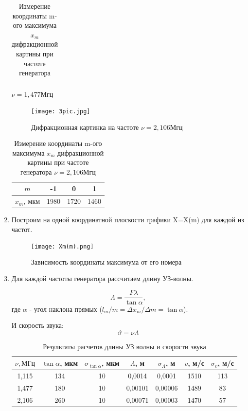 \documentclass[a4paper,12pt]{article} %
\theoremstyle{plain} %
\theoremstyle{definition} %
\theoremstyle{remark} %
\begin{document}
\begin{enumerate}
\begin{table}[!ht]
\begin{tabular}{|c|c|c|c|}
	\end{tabular}
	\caption{Измерение координаты m-ого максимума $x_m$ дифракционной картины при частоте генератора} $\nu=1,477 Мгц$
\end{table}

\newline

\begin{figure}[H]
	\centering
	\texttt{[image: 3pic.jpg]}
	\caption{Дифракционная картинка на частоте $\nu=2,106 Мгц$}
	\label{3diff2}
\end{figure}

\begin{table}[!ht]
	\centering
	\begin{tabular}{|c|c|c|c|}
		\hline
		$m$ &-1&0&1\\
		\hline
		$x_m, \ мкм$ &1980&1720& 1460\\
		\hline
	\end{tabular}
	\caption{Измерение координаты m-ого максимума $x_m$ дифракционной картины при частоте генератора $\nu=2,106 Мгц$}
\end{table}

\item Построим на одной координатной плоскости графики X=X(m) для каждой из частот. 

\begin{figure}[H]
	\centering
	\texttt{[image: Xm(m).png]}
	\caption{Зависимость координаты максимума от его номера}
	\label{g1}
\end{figure}

\item Для каждой частоты генератора рассчитаем длину УЗ-волны. 

\begin{equation}
	\Lambda=\dfrac{F\lambda}{\tan \alpha},
\end{equation}
где $\alpha$ - угол наклона прямых ($l_m/m=\Delta x_m/\Delta m = \tan \alpha$).

И скорость звука:
\begin{equation}
	\vartheta=\nu\Lambda
\end{equation}

\begin{table}[!ht]
	\centering
	\begin{tabular}{|c|c|c|c|c|c|c|}
		\hline
		$\nu, МГц$ & $\tan \alpha$, мкм & $\sigma_{\tan \alpha}$, мкм & $\Lambda$, м & $\sigma_{\Lambda}$, м & $v$, м/с & $\sigma_{v}$, м/с \\ \hline
		1,115 & 134 & 10 & 0,0014 & 0,0001 & 1510 & 113   \\ \hline
		1,477 & 180 & 10 & 0,00101 & 0,00006 & 1489 & 83   \\ \hline
		2,106 & 260 & 10 & 0,00071 & 0,00003 & 1470 & 57   \\ \hline
	\end{tabular}
	\caption{Результаты расчетов длины УЗ волны и скорости звука}
\end{table}


\end{enumerate}
\end{document}

